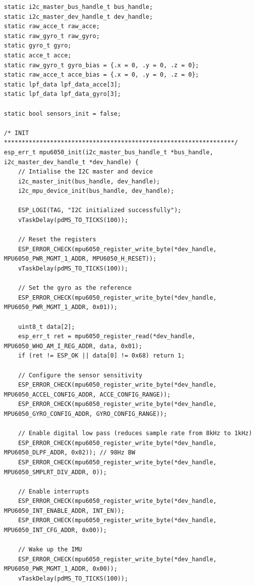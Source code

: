 \begin{lstlisting}
static i2c_master_bus_handle_t bus_handle;
static i2c_master_dev_handle_t dev_handle;
static raw_acce_t raw_acce; 
static raw_gyro_t raw_gyro;
static gyro_t gyro;
static acce_t acce;
static raw_gyro_t gyro_bias = {.x = 0, .y = 0, .z = 0};
static raw_acce_t acce_bias = {.x = 0, .y = 0, .z = 0};
static lpf_data lpf_data_acce[3];
static lpf_data lpf_data_gyro[3];

static bool sensors_init = false;

/* INIT *****************************************************************/
esp_err_t mpu6050_init(i2c_master_bus_handle_t *bus_handle, i2c_master_dev_handle_t *dev_handle) {
    // Intialise the I2C master and device
    i2c_master_init(bus_handle, dev_handle);
    i2c_mpu_device_init(bus_handle, dev_handle);

    ESP_LOGI(TAG, "I2C initialized successfully");
    vTaskDelay(pdMS_TO_TICKS(100)); 
    
    // Reset the registers
    ESP_ERROR_CHECK(mpu6050_register_write_byte(*dev_handle, MPU6050_PWR_MGMT_1_ADDR, MPU6050_H_RESET));
    vTaskDelay(pdMS_TO_TICKS(100)); 
    
    // Set the gyro as the reference
    ESP_ERROR_CHECK(mpu6050_register_write_byte(*dev_handle, MPU6050_PWR_MGMT_1_ADDR, 0x01));

    uint8_t data[2];
    esp_err_t ret = mpu6050_register_read(*dev_handle, MPU6050_WHO_AM_I_REG_ADDR, data, 0x01);
    if (ret != ESP_OK || data[0] != 0x68) return 1;
        
    // Configure the sensor sensitivity
    ESP_ERROR_CHECK(mpu6050_register_write_byte(*dev_handle, MPU6050_ACCEL_CONFIG_ADDR, ACCE_CONFIG_RANGE));
    ESP_ERROR_CHECK(mpu6050_register_write_byte(*dev_handle, MPU6050_GYRO_CONFIG_ADDR, GYRO_CONFIG_RANGE));

    // Enable digital low pass (reduces sample rate from 8kHz to 1kHz)
    ESP_ERROR_CHECK(mpu6050_register_write_byte(*dev_handle, MPU6050_DLPF_ADDR, 0x02)); // 98Hz BW
    ESP_ERROR_CHECK(mpu6050_register_write_byte(*dev_handle, MPU6050_SMPLRT_DIV_ADDR, 0));

    // Enable interrupts
    ESP_ERROR_CHECK(mpu6050_register_write_byte(*dev_handle, MPU6050_INT_ENABLE_ADDR, INT_EN));
    ESP_ERROR_CHECK(mpu6050_register_write_byte(*dev_handle, MPU6050_INT_CFG_ADDR, 0x00));

    // Wake up the IMU
    ESP_ERROR_CHECK(mpu6050_register_write_byte(*dev_handle, MPU6050_PWR_MGMT_1_ADDR, 0x00));
    vTaskDelay(pdMS_TO_TICKS(100)); 


\end{lstlisting}
